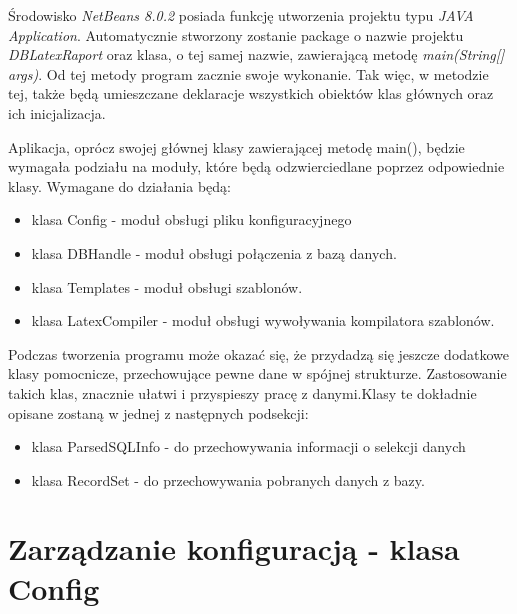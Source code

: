 Środowisko \emph{NetBeans 8.0.2} posiada funkcję utworzenia projektu typu \emph{JAVA Application}. Automatycznie stworzony zostanie package o nazwie projektu \emph{DBLatexRaport} oraz klasa, o tej samej nazwie, zawierającą metodę \emph{main(String[] args)}. Od tej metody program zacznie swoje wykonanie. Tak więc, w metodzie tej, także będą umieszczane deklaracje wszystkich obiektów klas głównych oraz ich inicjalizacja. 
\par 
Aplikacja, oprócz swojej głównej klasy zawierającej metodę main(), będzie wymagała podziału na moduły, które będą odzwierciedlane poprzez odpowiednie klasy. Wymagane do działania będą:
\begin{itemize}
\item klasa Config - moduł obsługi pliku konfiguracyjnego 
\item klasa DBHandle - moduł obsługi połączenia z bazą danych.
\item klasa Templates - moduł obsługi szablonów.
\item klasa LatexCompiler -  moduł obsługi wywoływania kompilatora szablonów.
\end{itemize}
\vspace{5mm}
Podczas tworzenia programu może okazać się, że przydadzą się jeszcze dodatkowe klasy pomocnicze, przechowujące pewne dane w spójnej strukturze. Zastosowanie takich klas, znacznie ułatwi i przyspieszy pracę z danymi.Klasy te dokładnie opisane zostaną w jednej z następnych podsekcji:
\begin{itemize}
\item klasa ParsedSQLInfo - do przechowywania informacji o selekcji danych
\item klasa RecordSet - do przechowywania pobranych danych z bazy.
\end{itemize}

\section{Zarządzanie konfiguracją - klasa Config}

